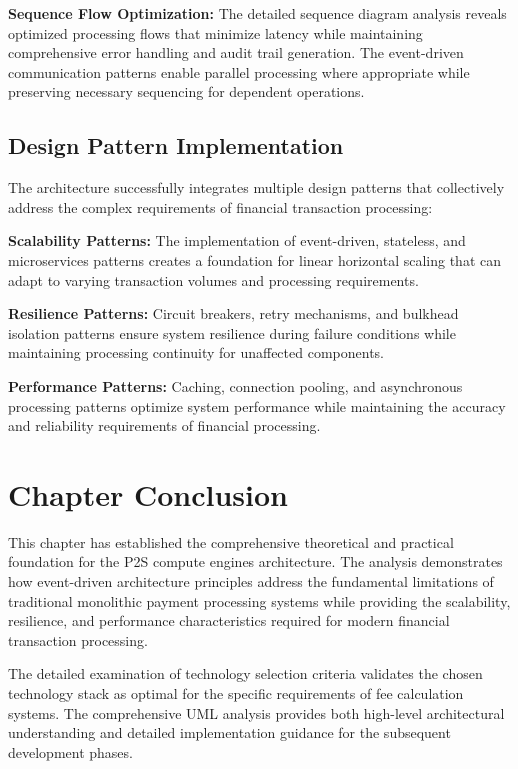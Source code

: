 \textbf{Sequence Flow Optimization:}
The detailed sequence diagram analysis reveals optimized processing flows that minimize latency while maintaining comprehensive error handling and audit trail generation. The event-driven communication patterns enable parallel processing where appropriate while preserving necessary sequencing for dependent operations.

\subsection{Design Pattern Implementation}

The architecture successfully integrates multiple design patterns that collectively address the complex requirements of financial transaction processing:

\textbf{Scalability Patterns:}
The implementation of event-driven, stateless, and microservices patterns creates a foundation for linear horizontal scaling that can adapt to varying transaction volumes and processing requirements.

\textbf{Resilience Patterns:}
Circuit breakers, retry mechanisms, and bulkhead isolation patterns ensure system resilience during failure conditions while maintaining processing continuity for unaffected components.

\textbf{Performance Patterns:}
Caching, connection pooling, and asynchronous processing patterns optimize system performance while maintaining the accuracy and reliability requirements of financial processing.

\section{Chapter Conclusion}

This chapter has established the comprehensive theoretical and practical foundation for the P2S compute engines architecture. The analysis demonstrates how event-driven architecture principles address the fundamental limitations of traditional monolithic payment processing systems while providing the scalability, resilience, and performance characteristics required for modern financial transaction processing.

The detailed examination of technology selection criteria validates the chosen technology stack as optimal for the specific requirements of fee calculation systems. The comprehensive UML analysis provides both high-level architectural understanding and detailed implementation guidance for the subsequent development phases.

